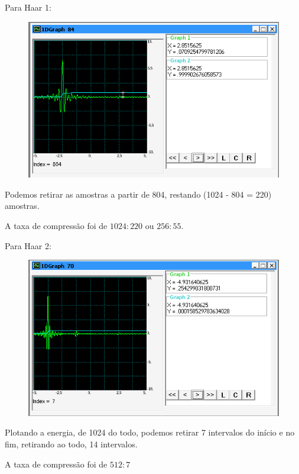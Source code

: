 \documentclass[10pt]{article}
\begin{document}
Para Haar 1:
\begin{figure}[h]
    \includegraphics[scale=0.5]{haar1.png}
    \centering
    \caption{}
\end{figure}

Podemos retirar as amostras a partir de 804, restando (1024 - 804 = 220) amostras.

A taxa de compressão foi de $1024:220$ ou $256:55$.

Para Haar 2:
\begin{figure}[h]
    \includegraphics[scale=0.5]{haar2.png}
    \centering
    \caption{}
\end{figure}

Plotando a energia, de 1024 do todo, podemos retirar 7 intervalos do início e no fim, retirando ao todo, 14 intervalos.

A taxa de compressão foi de $512:7$

\newpage
\end{document}
